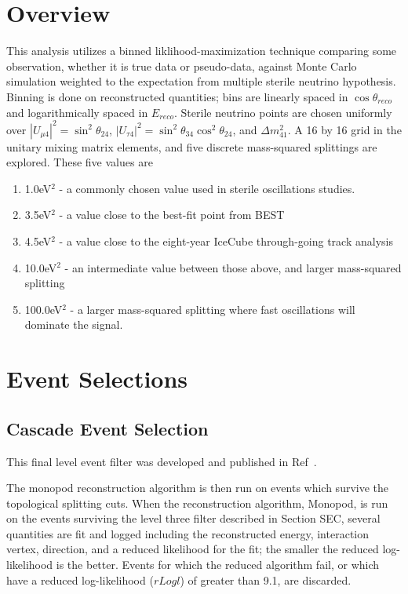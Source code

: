 \documentclass[main.tex]{subfiles}
\begin{document}
\section{Overview}

This analysis utilizes a binned liklihood-maximization technique comparing some observation, whether it is true data or pseudo-data, against Monte Carlo simulation weighted to the expectation from multiple sterile neutrino hypothesis. 
Binning is done on reconstructed quantities; bins are linearly spaced in $\cos\theta_{reco}$ and logarithmically spaced in $E_{reco}$. 
Sterile neutrino points are chosen uniformly over $\left|U_{\mu 4}\right|^{2}=\sin^{2}\theta_{24}$, $\left|U_{\tau 4}\right|^{2}=\sin^{2}\theta_{34}\cos^{2}\theta_{24}$, and $\Delta m_{41}^{2}$. 
A 16 by 16 grid in the unitary mixing matrix elements, and five discrete mass-squared splittings are explored. 
These five values are 
\begin{enumerate}
    \item 1.0eV$^{2}$ - a commonly chosen value used in sterile oscillations studies. 
    \item 3.5eV$^{2}$ - a value close to the best-fit point from BEST~\cite{barinov2021results}
    \item 4.5eV$^{2}$ - a value close to the eight-year IceCube through-going track analysis~\cite{Aartsen_2020, Aartsen_2020_prd}
    \item 10.0eV$^{2}$ - an intermediate value between those above, and larger mass-squared splitting
    \item 100.0eV$^{2}$ - a larger mass-squared splitting where fast oscillations will dominate the signal. 
\end{enumerate}

\section{Event Selections}

\subsection{Cascade Event Selection}

This final level event filter was developed and published in Ref~\cite{2018PhDT17N}.

The monopod reconstruction algorithm is then run on events which survive the topological splitting cuts. 
When the reconstruction algorithm, Monopod, is run on the events surviving the level three filter described in Section SEC, 
several quantities are fit and logged including the reconstructed energy, interaction vertex, direction, and a reduced likelihood for the fit; the smaller the reduced log-likelihood is the better. 
Events for which the reduced algorithm fail, or which have a reduced log-likelihood ($rLogl$) of greater than 9.1, are discarded. 
\end{document}
